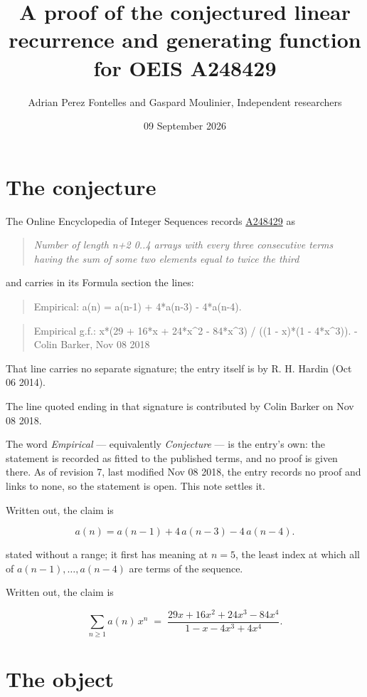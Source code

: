 \documentclass[11pt]{article}
\title{A proof of the conjectured linear recurrence and generating function for OEIS A248429}
\author{Adrian Perez Fontelles and Gaspard Moulinier, Independent researchers}
\date{09 September 2026}
\theoremstyle{definition}
\begin{document}
\maketitle
\section{The conjecture}

The Online Encyclopedia of Integer Sequences records \href{https://oeis.org/A248429}{A248429} as

\begin{quote}\itshape Number of length n+2 0..4 arrays with every three consecutive terms having the sum of some two elements equal to twice the third\end{quote}

and carries in its Formula section the lines:

\begin{quote}\ttfamily Empirical: a(n) = a(n-1) + 4*a(n-3) - 4*a(n-4).\end{quote}

\begin{quote}\ttfamily Empirical g.f.: x*(29 + 16*x + 24*x\textasciicircum{}2 - 84*x\textasciicircum{}3) / ((1 - x)*(1 - 4*x\textasciicircum{}3)). - Colin Barker, Nov 08 2018\end{quote}

That line carries no separate signature; the entry itself is by R. H. Hardin (Oct 06 2014).

The line quoted ending in that signature is contributed by Colin Barker on Nov 08 2018.

The word {\itshape Empirical} --- equivalently {\itshape Conjecture} --- is the entry's own: the statement is recorded as fitted to the published terms, and no proof is given there. As of revision 7, last modified Nov 08 2018, the entry records no proof and links to none, so the statement is open. This note settles it.

Written out, the claim is

\[a(n) = a(n-1) + 4\,a(n-3) - 4\,a(n-4).\]

stated without a range; it first has meaning at $n = 5$, the least index at which all of $a(n-1),\dots,a(n-4)$ are terms of the sequence.

Written out, the claim is

\[\sum_{n \ge 1} a(n)\,x^n \;=\; \frac{29x + 16x^{2} + 24x^{3} - 84x^{4}}{1 - x - 4x^{3} + 4x^{4}}.\]

\section{The object}
\end{document}
